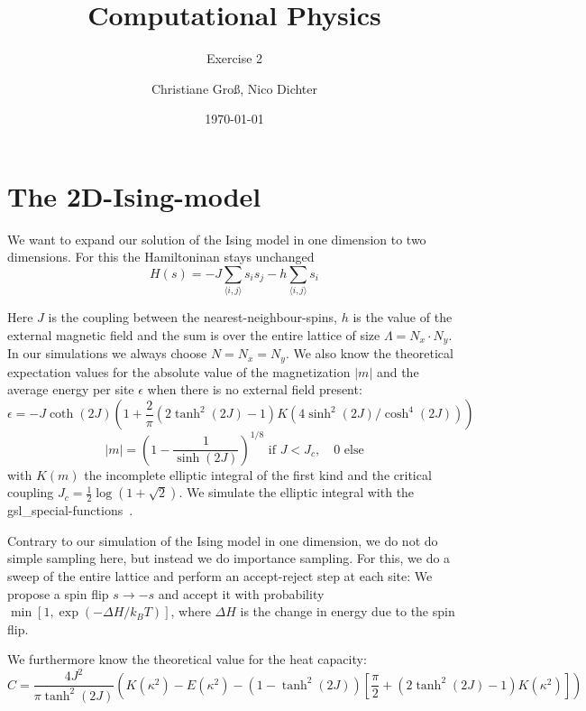 \documentclass{scrartcl}
\title{Computational Physics}
\subtitle{Exercise 2}
\date{\today}
\author{Christiane Groß, Nico Dichter}
\begin{document}
	\maketitle
\section{The 2D-Ising-model}
We want to expand our solution of the Ising model in one dimension to two dimensions. For this the Hamiltoninan stays unchanged 
\begin{equation}
H(s)=-J\sum_{\langle i,j\rangle }s_is_j-h\sum_{\langle i,j\rangle }s_i
\label{eq:hamiltonianising}
\end{equation}

Here $J$ is the coupling between the nearest-neighbour-spins, $h$ is the value of the external magnetic field and the sum is over the entire lattice of size $\Lambda=N_x \cdot N_y$. In our simulations we always choose $N=N_x=N_y$.
We also know the theoretical expectation values for the  absolute value of the magnetization $|m|$ and the average energy per site $\epsilon$ when there is no external field present:
\begin{equation}
\epsilon=-J\coth(2J)\left( 1+\frac{2}{\pi}(2\tanh^2(2J)-1)K(4\sinh^2(2J)/\cosh^4(2J))\right) 
\end{equation}
\begin{equation}
|m|=\left( 1-\frac{1}{\sinh(2J)}\right)^{1/8} \text{ if } J<J_c,\quad 0 \text{ else}   
\end{equation}
 with $K(m)$ the incomplete elliptic integral of the first kind and the critical coupling $J_c=\frac{1}{2}\log(1+\sqrt{2})$. We simulate the elliptic integral with the gsl\_special-functions~\cite{gsldoc_sf}.
 
 Contrary to our simulation of the Ising model in one dimension, we do not do simple sampling here, but instead we do importance sampling. For this, we do a sweep of the entire lattice and perform an accept-reject step at each site: We propose a spin flip $s\rightarrow-s$ and accept it with probability $\min \left[1, \exp(-\Delta H/k_BT)\right]$, where $\Delta H$ is the change in energy due to the spin flip.  

We furthermore know the theoretical value for the heat capacity:
\begin{equation}
C=\frac{4J^2}{\pi\tanh^2(2J)}\left( K(\kappa^2)-E(\kappa^2)-\left(1-\tanh^2(2J)\right)\left[\frac{\pi}{2} +\left(2\tanh^2(2J)-1\right)K(\kappa^2)\right] \right)
\end{equation}
\end{document}

